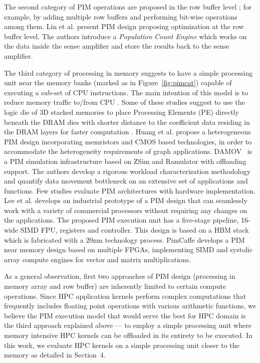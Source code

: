 
The second category of PIM operations are proposed in the row buffer level ; for example, by adding multiple row buffers and performing bit-wise operations among them. Lin et al. \cite{31} present PIM design proposing optimization at the row buffer level. The authors introduce a \textit{Population Count Engine} which works on the data inside the sense amplifier and store the results back to the sense amplifier.

The third category of processing in memory suggests to have a simple processing unit near the memory banks (marked as  in Figure~\ref{fig:pimcat}) capable of executing a sub-set of CPU instructions. The main intention of this model is to reduce memory traffic to/from CPU \cite{01,02,05,11,12,17,30,32,33,34,35,71}. Some of these studies suggest to use the logic die of 3D stacked memories to place Processing Elements (PE) directly beneath the DRAM dies with shorter distance to the coefficient data residing in the DRAM layers for faster computation \cite{09,12,30,32}.  Huang et al. \cite{33} propose a heterogeneous PIM design incorporating memristors and CMOS based technologies, in order to accommodate the heterogeneity requirements of graph applications. DAMOV~\cite{71} is a PIM simulation infrastructure based on ZSim\fixme{[]} and Ramulator \fixme{[]} with offloading support. The authors develop a rigorous workload characterization methodology and quantify data movement bottleneck on an extensive set of applications and functions. Few studies evaluate PIM architectures with hardware implementation. Lee et al. \cite{12} develops an industrial prototype of a PIM design that can seamlessly work with a variety of commercial processors without requiring any changes on the applications. The proposed PIM execution unit has a five-stage pipeline, 16-wide SIMD FPU, registers and controller. This design is based on a HBM stack which is fabricated with a 20nm technology process. PimCaffe \cite{16} develops a PIM near memory design based on multiple FPGAs, implementing SIMD and systolic array compute engines for vector and matrix multiplications.    

As a general observation, first two approaches of PIM design (processing in memory array and row buffer) are inherently limited to certain compute operations. Since HPC application kernels perform complex computations that frequently includes floating point operations with various arithmetic functions, we believe the PIM execution model that would serve the best for HPC domain is the third approach explained above --- to employ a simple processing unit where memory intensive HPC kernels can be offloaded in its entirety to be executed. In this work, we evaluate HPC kernels on a simple processing unit closer to the memory as detailed in Section~4. 

